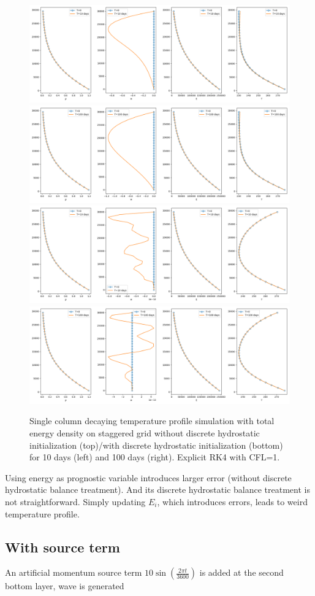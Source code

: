 \documentclass{report}
\begin{document}
\begin{figure}
    \centering
    \includegraphics[width=0.45 \textwidth]{CLIMA-numerics/figures/staggered/HB-E-10-HB-false.png}
    \includegraphics[width=0.45 \textwidth]{CLIMA-numerics/figures/staggered/HB-E-100-HB-false.png}
    \includegraphics[width=0.45 \textwidth]{CLIMA-numerics/figures/staggered/HB-E-10-HB-true.png}
    \includegraphics[width=0.45 \textwidth]{CLIMA-numerics/figures/staggered/HB-E-100-HB-true.png}
    \caption{Single column decaying temperature profile simulation with total energy density on staggered grid without discrete hydrostatic initialization (top)/with discrete hydrostatic initialization (bottom) for 10 days (left) and 100 days (right). Explicit RK4 with CFL=1.}
    \label{fig:my_label}
\end{figure}

Using energy as prognostic variable introduces larger error (without discrete hydrostatic balance treatment). And its discrete hydrostatic balance treatment is not straightforward. Simply updating $E_i$, which introduces errors, leads to weird temperature profile.

\subsection{With source term}
An artificial momentum source term $10\sin(\frac{2\pi t}{3600})$ is added at the second bottom layer, wave is generated 
\end{document}
